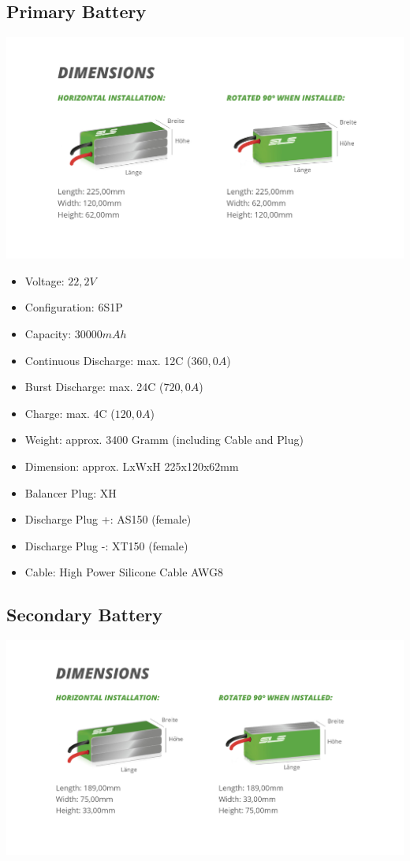 \subsection{Primary Battery}
\label{prim-battery}

\includegraphics[width=\textwidth]{contents/figures/prim-battery.png}

\begin{itemize}
    \item Voltage: $22,2V$
    \item Configuration: 6S1P
    \item Capacity: $30000mAh$
    \item Continuous Discharge: max. 12C ($360,0A$)
    \item Burst Discharge: max. 24C ($720,0A$)
    \item Charge: max. 4C ($120,0A$)
    \item Weight: approx. 3400 Gramm (including Cable and Plug)
    \item Dimension: approx. LxWxH 225x120x62mm 
    \item Balancer Plug: XH
    \item Discharge Plug +: AS150 (female)
    \item Discharge Plug -: XT150 (female)
    \item Cable: High Power Silicone Cable AWG8
\end{itemize}

\clearpage %

\subsection{Secondary Battery}
\label{sec-battery}

\includegraphics[width=\textwidth]{contents/figures/sec-battery.png}

